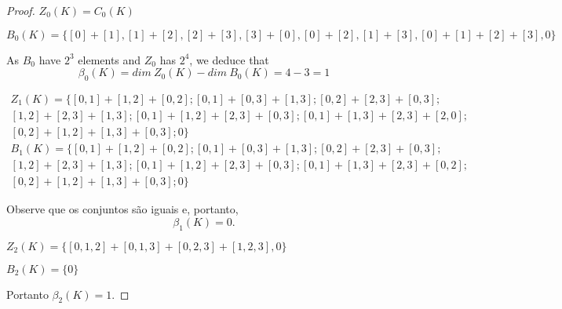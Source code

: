 \begin{proof}

$Z_0(K) = C_0(K)$

$B_0(K) = \{[0] + [1], [1] + [2], [2] + [3], [3] + [0], [0] + [2], [1] + [3],
[0] + [1] + [2] + [3], 0\}$

As $B_0$ have $2^3$ elements and $Z_0$ has $2^4$, we deduce that 
$$\beta_0(K) = dim ~Z_0(K) - dim ~B_0(K) = 4 - 3 = 1$$

\begin{multline}
    Z_1(K) = \{[0,1] + [1,2] + [0,2]; [0,1] + [0,3] + [1,3]; [0,2] + [2,3] +
    [0,3]; \\ 
    [1,2] + [2,3] + [1,3]; [0,1] + [1,2] + [2,3] + [0,3]; [0,1] + [1,3] + [2,3] + [2,0]; \\
    [0,2] + [1,2] + [1,3] + [0,3]; 0
    \}    
\end{multline}
\begin{multline}
    B_1(K) = \{[0,1] + [1,2] + [0,2]; [0,1] + [0,3] + [1,3]; [0,2] + [2,3] +
    [0,3]; \\ 
    [1,2] + [2,3] + [1,3]; 
    [0,1] + [1,2] + [2,3] + [0,3]; [0,1] + [1,3] + [2,3] + [0,2]; \\
    [0,2] + [1,2] + [1,3] + [0,3]; 0
    \}    
\end{multline}

Observe que os conjuntos são iguais e, portanto, 
$$\beta_1(K) = 0.$$

$Z_2(K) = \{[0,1,2] +[0,1,3] + [0,2,3] + [1,2,3], 0\}$

$B_2(K) = \{0\}$

Portanto $\beta_2(K) = 1$. 

\end{proof}